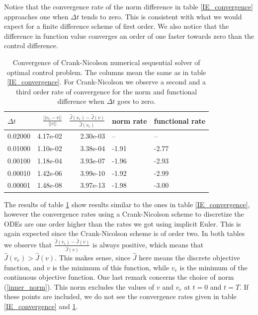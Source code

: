 Notice that the convergence rate of the norm difference in table \ref{IE_convergence} approaches one when $\Delta t$ tends to zero. This is consistent with what we would expect for a finite difference scheme of first order. We also notice that the difference in function value converges an order of one faster towards zero than the control difference.  
\begin{table}[!h]
\caption{Convergence of Crank-Nicolson numerical sequential solver of optimal control problem. The columns mean the same as in table \ref{IE_convergence}. For Crank-Nicolson we observe a second and a third order rate of convergence for the norm and functional difference when $\Delta t$ goes to zero.} \label{CN_convergence}
\centering
\begin{tabular}{lrrll}
\toprule
{} $\Delta t$&    $\frac{||v_e-v||}{||v||}$ &  $\frac{\hat J(v_e)-\hat J(v)}{\hat J(v_e)}$ &   norm rate &    functional rate \\
\midrule
0.02000 &  4.17e-02 &  2.30e-03 &       -- &       -- \\
0.01000 &  1.10e-02 &  3.38e-04 &  -1.91 & -2.77 \\
0.00100 &  1.18e-04 &  3.93e-07 & -1.96 & -2.93 \\
0.00010 &  1.42e-06 &  3.99e-10 & -1.92 & -2.99 \\
0.00001 &  1.48e-08 &  3.97e-13 & -1.98 &  -3.00 \\
\bottomrule
\end{tabular}
\end{table}
The results of table \ref{CN_convergence} show results similar to the ones in table \ref{IE_convergence}, however the convergence rates using a Crank-Nicolson scheme to discretize the ODEs are one order higher than the rates we got using implicit Euler. This is again expected since the Crank-Nicolson scheme is of order two. In both tables we observe that $\frac{\hat J(v_e)-\hat J(v)}{\hat J(v)}$ is always positive, which means that $\hat J(v_e)>\hat J(v)$. This makes sense, since $\hat J$ here means the discrete objective function, and $v$ is the minimum of this function, while $v_e$ is the minimum of the continuous objective function. One last remark concerns the choice of norm (\ref{inner_norm}). This norm excludes the values of $v$ and $v_e$ at $t=0$ and $t=T$. If these points are included, we do not see the convergence rates given in table \ref{IE_convergence} and \ref{CN_convergence}. 
